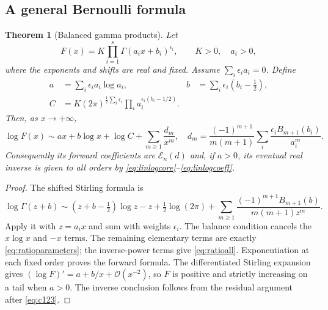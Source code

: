 \documentclass[11pt,a4paper]{article}
\newtheorem{theorem}{Theorem}[section]
\theoremstyle{definition}
\theoremstyle{remark}
\newcommand{\OO}{\mathcal O}
\newcommand{\ExpC}{\mathcal E}
\numberwithin{equation}{section}
\begin{document}
\subsection{A general Bernoulli formula}
\begin{theorem}[Balanced gamma products]
\label{thm:ratios}
Let
\begin{equation}
 F(x)=K\prod_{i=1}^s\Gamma(a_ix+b_i)^{\epsilon_i},
 \qquad K>0,\quad a_i>0,
 \label{eq:gammaratio}
\end{equation}
where the exponents and shifts are real and fixed. Assume
$\sum_i\epsilon_i a_i=0$. Define
\begin{align}
 a&=\sum_i\epsilon_i a_i\log a_i,
 &b&=\sum_i\epsilon_i(b_i-\tfrac12),\nonumber\\
 C&=K(2\pi)^{\frac12\sum_i\epsilon_i}
 \prod_i a_i^{\epsilon_i(b_i-1/2)}.
 \label{eq:ratioparameters}
\end{align}
Then, as $x\to+\infty$,
\begin{equation}
 \log F(x)\sim ax+b\log x+\log C+
 \sum_{m\ge1}\frac{d_m}{x^m},
 \quad
 d_m=\frac{(-1)^{m+1}}{m(m+1)}
 \sum_i\frac{\epsilon_i B_{m+1}(b_i)}{a_i^m}.
 \label{eq:ratioall}
\end{equation}
Consequently its forward coefficients are $\ExpC_n(d)$ and, if $a>0$, its eventual real inverse is given to all orders by \eqref{eq:linlogcore}--\eqref{eq:linlogcoeff}.
\end{theorem}
\begin{proof}
The shifted Stirling formula \cite{dlmfgamma} is
\[
 \log\Gamma(z+b)\sim(z+b-\tfrac12)\log z-z+
 \tfrac12\log(2\pi)+
 \sum_{m\ge1}\frac{(-1)^{m+1}B_{m+1}(b)}{m(m+1)z^m}.
\]
Apply it with $z=a_ix$ and sum with weights $\epsilon_i$. The balance condition cancels the $x\log x$ and $-x$ terms. The remaining elementary terms are exactly \eqref{eq:ratioparameters}; the inverse-power terms give \eqref{eq:ratioall}. Exponentiation at each fixed order proves the forward formula. The differentiated Stirling expansion gives $(\log F)'=a+b/x+\OO(x^{-2})$, so $F$ is positive and strictly increasing on a tail when $a>0$. The inverse conclusion follows from the residual argument after \eqref{eq:c123}.
\end{proof}
\end{document}
